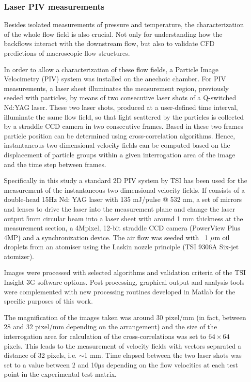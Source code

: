 \subsubsection{Laser PIV measurements}\label{sub:setup_piv}

Besides isolated measurements of pressure and temperature, the characterization of the whole flow field is also crucial. Not only for understanding how the backflows interact with the downstream flow, but also to validate CFD predictions of macroscopic flow structures.

In order to allow a characterization of these flow fields, a Particle Image Velocimetry (PIV) system was installed on the anechoic chamber. For PIV measurements, a laser sheet illuminates the measurement region, previously seeded with particles, by means of two consecutive laser shots of a Q-switched Nd:YAG laser. These two laser shots, produced at a user-defined time interval, illuminate the same flow field, so that light scattered by the particles is collected by a straddle CCD camera in two consecutive frames. Based in these two frames particle position can be determined using cross-correlation algorithms. Hence, instantaneous two-dimensional velocity fields can be computed based on the displacement of particle groups within a given interrogation area of the image and the time step between frames. 

Specifically in this study a standard 2D PIV system by TSI has been used for the measurement of the instantaneous two-dimensional velocity fields. If consists of a double-head 15Hz Nd: YAG laser with 135 mJ/pulse @ 532 nm, a set of mirrors and lenses to drive the laser into the measurement plane and change the laser output 5mm circular beam into a laser sheet with around 1 mm thickness at the measurement section, a 4Mpixel, 12-bit straddle CCD camera (PowerView Plus 4MP) and a synchronization device. 
The air flow was seeded with ~1 $\mu$m oil droplets from an atomiser using the Laskin nozzle principle (TSI 9306A Six-jet atomizer).

Images were processed with selected algorithms and validation criteria of the TSI Insight 3G software options. Post-processing, graphical output and analysis tools were complemented with new processing routines developed in Matlab for the specific purposes of this work. 

The magnification of the images taken was around 30 pixel/mm (in fact, between 28 and 32 pixel/mm depending on the arrangement) and the size of the interrogation area for calculation of the cross-correlations was set to $64\times 64$ pixels. This leads to the measurement of velocity fields with vectors separated a distance of 32 pixels, i.e. $\sim$1 mm. Time elapsed between the two laser shots was set to a value between 2 and 10µs depending on the flow velocities at each test point in the experimental test matrix.

